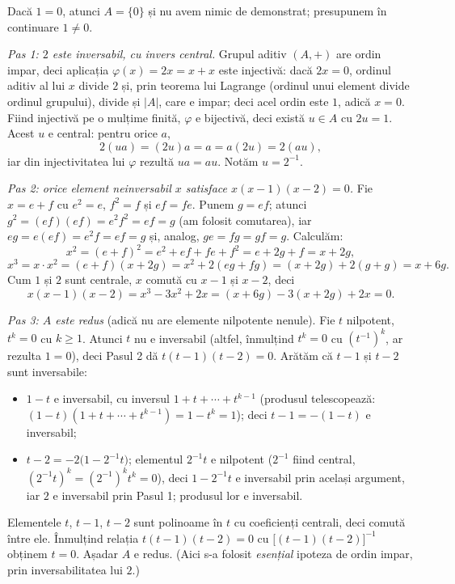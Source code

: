 \begin{solutie}
Dacă $1=0$, atunci $A=\{0\}$ și nu avem nimic de demonstrat; presupunem
în continuare $1\neq0$.

\smallskip
\textit{Pas 1: $2$ este inversabil, cu invers central.} Grupul aditiv
$(A,+)$ are ordin impar, deci aplicația $\varphi(x)=2x=x+x$ este
injectivă: dacă $2x=0$, ordinul aditiv al lui $x$ divide $2$ și,
prin teorema lui Lagrange (ordinul unui element divide ordinul grupului),
divide și $|A|$, care e impar; deci acel ordin este $1$, adică $x=0$.
Fiind injectivă pe o mulțime finită, $\varphi$ e bijectivă,
deci există $u\in A$ cu $2u=1$. Acest $u$ e central: pentru orice $a$,
\[
  2(ua)=(2u)a=a=a(2u)=2(au),
\]
iar din injectivitatea lui $\varphi$ rezultă $ua=au$. Notăm
$u=2^{-1}$.

\smallskip
\textit{Pas 2: orice element neinversabil $x$ satisface $x(x-1)(x-2)=0$.}
Fie $x=e+f$ cu $e^{2}=e$, $f^{2}=f$ și $ef=fe$. Punem $g=ef$; atunci
$g^{2}=(ef)(ef)=e^{2}f^{2}=ef=g$ (am folosit comutarea), iar
$eg=e(ef)=e^{2}f=ef=g$ și, analog, $ge=fg=gf=g$. Calculăm:
\[
  x^{2}=(e+f)^{2}=e^{2}+ef+fe+f^{2}=e+2g+f=x+2g ,
\]
\[
  x^{3}=x\cdot x^{2}=(e+f)(x+2g)=x^{2}+2(eg+fg)=(x+2g)+2(g+g)=x+6g .
\]
Cum $1$ și $2$ sunt centrale, $x$ comută cu $x-1$ și $x-2$, deci
\[
  x(x-1)(x-2)=x^{3}-3x^{2}+2x=(x+6g)-3(x+2g)+2x=0 .
\]

\smallskip
\textit{Pas 3: $A$ este redus} (adică nu are elemente nilpotente nenule).
Fie $t$ nilpotent, $t^{k}=0$ cu $k\ge 1$. Atunci $t$ nu e inversabil (altfel,
înmulțind $t^{k}=0$ cu $(t^{-1})^{k}$, ar rezulta $1=0$), deci Pasul 2
dă $t(t-1)(t-2)=0$. Arătăm că $t-1$ și $t-2$ sunt
inversabile:
\begin{itemize}[nosep,leftmargin=1.4em]
  \item $1-t$ e inversabil, cu inversul $1+t+\cdots+t^{k-1}$ (produsul
        telescopează: $(1-t)(1+t+\cdots+t^{k-1})=1-t^{k}=1$); deci
        $t-1=-(1-t)$ e inversabil;
  \item $t-2=-2\bigl(1-2^{-1}t\bigr)$; elementul $2^{-1}t$ e nilpotent
        ($2^{-1}$ fiind central, $(2^{-1}t)^{k}=(2^{-1})^{k}t^{k}=0$), deci
        $1-2^{-1}t$ e inversabil prin același argument, iar $2$ e
        inversabil prin Pasul 1; produsul lor e inversabil.
\end{itemize}
Elementele $t$, $t-1$, $t-2$ sunt polinoame în $t$ cu coeficienți
centrali, deci comută între ele. Înmulțind relația
$t(t-1)(t-2)=0$ cu $\bigl[(t-1)(t-2)\bigr]^{-1}$ obținem $t=0$. Așadar
$A$ e redus. (Aici s-a folosit \emph{esențial} ipoteza de ordin impar,
prin inversabilitatea lui $2$.)


\end{solutie}
